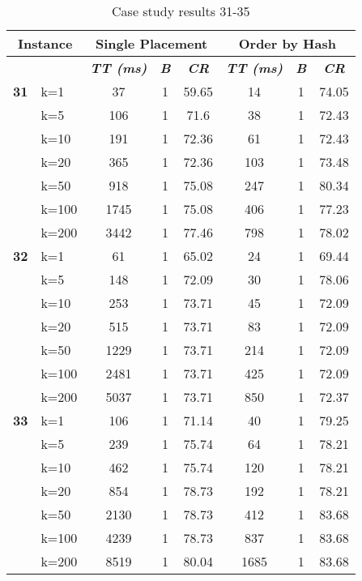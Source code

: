     \begin{table}[htbp]
    \caption{Case study results 31-35}
    \centering
    \begin{tabular}{|l|l|c|c|c|c|c|c|}
    \hline
    \multicolumn{ 2}{|c|}{\textbf{Instance}} & \multicolumn{ 3}{c|}{\textbf{Single Placement}} & \multicolumn{ 3}{c|}{\textbf{Order by Hash}} \\ \hline
    \multicolumn{ 2}{|l|}{} & \textbf{\textit{TT (ms)}} & \textbf{\textit{B}} & \textbf{\textit{CR}} & \textbf{\textit{TT (ms)}} & \textbf{\textit{B}} & \textbf{\textit{CR}} \\ \hline
    \multicolumn{1}{|r|}{\textbf{31}} & k=1 & 37 & 1 & 59.65 & 14 & 1 & 74.05 \\ 
     & k=5 & 106 & 1 & 71.6 & 38 & 1 & 72.43 \\ 
     & k=10 & 191 & 1 & 72.36 & 61 & 1 & 72.43 \\ 
     & k=20 & 365 & 1 & 72.36 & 103 & 1 & 73.48 \\ 
     & k=50 & 918 & 1 & 75.08 & 247 & 1 & 80.34 \\ 
     & k=100 & 1745 & 1 & 75.08 & 406 & 1 & 77.23 \\ 
     & k=200 & 3442 & 1 & 77.46 & 798 & 1 & 78.02 \\ \hline
    \multicolumn{1}{|r|}{\textbf{32}} & k=1 & 61 & 1 & 65.02 & 24 & 1 & 69.44 \\ 
     & k=5 & 148 & 1 & 72.09 & 30 & 1 & 78.06 \\ 
     & k=10 & 253 & 1 & 73.71 & 45 & 1 & 72.09 \\ 
     & k=20 & 515 & 1 & 73.71 & 83 & 1 & 72.09 \\ 
     & k=50 & 1229 & 1 & 73.71 & 214 & 1 & 72.09 \\ 
     & k=100 & 2481 & 1 & 73.71 & 425 & 1 & 72.09 \\ 
     & k=200 & 5037 & 1 & 73.71 & 850 & 1 & 72.37 \\ \hline
    \multicolumn{1}{|r|}{\textbf{33}} & k=1 & 106 & 1 & 71.14 & 40 & 1 & 79.25 \\ 
     & k=5 & 239 & 1 & 75.74 & 64 & 1 & 78.21 \\ 
     & k=10 & 462 & 1 & 75.74 & 120 & 1 & 78.21 \\ 
     & k=20 & 854 & 1 & 78.73 & 192 & 1 & 78.21 \\ 
     & k=50 & 2130 & 1 & 78.73 & 412 & 1 & 83.68 \\ 
     & k=100 & 4239 & 1 & 78.73 & 837 & 1 & 83.68 \\ 
     & k=200 & 8519 & 1 & 80.04 & 1685 & 1 & 83.68 \\ \hline

\end{tabular}
\end{table}
